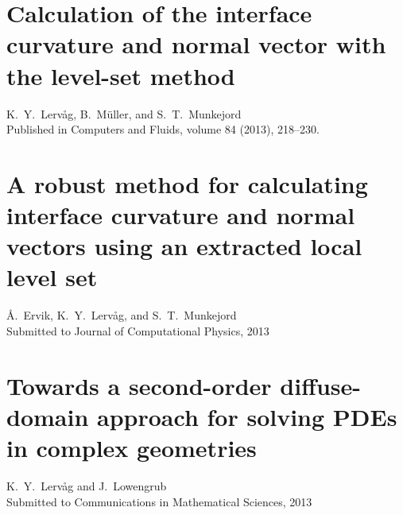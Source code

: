 \documentclass[11pt,b5paper,DIV=calc,BCOR1.3cm,headings=small,%
               footinclude=false,headsepline]{scrbook}
\begin{document}
\cleardoublepage


\chapter{Calculation of the interface curvature and normal vector with the
  level-set method}
K.\ Y.\ Lervåg, B.\ Müller, and S.\ T.\ Munkejord\\
Published in Computers and Fluids, volume 84 (2013), 218--230.

\cleardoublepage


\chapter{A robust method for calculating interface curvature and normal vectors
  using an extracted local level set}
Å.\ Ervik, K.\ Y.\ Lervåg, and S.\ T.\ Munkejord\\
Submitted to Journal of Computational Physics, 2013

\cleardoublepage


\chapter{Towards a second-order diffuse-domain approach for solving PDEs in
  complex geometries}
K.\ Y.\ Lervåg and J.\ Lowengrub\\
Submitted to Communications in Mathematical Sciences, 2013

\cleardoublepage

\end{document}
